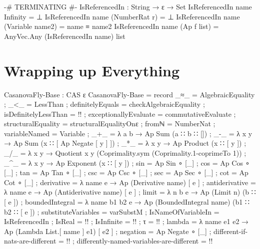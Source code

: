 \documentclass{report}
\begin{document}
\begin{code}
{-# TERMINATING #-}
IsReferencedIn : String → ε → Set
IsReferencedIn name Infinity = ⊥
IsReferencedIn name (NumberRat r) = ⊥
IsReferencedIn name (Variable name2) = name ≡ name2
IsReferencedIn name (Ap f list) = AnyVec.Any (IsReferencedIn name) list
\end{code}

\chapter{Wrapping up Everything}

\begin{code}
CasanovaFly-Base : CAS ε
CasanovaFly-Base = record
  { _≈_ = AlgebraicEquality
  ; _<_ = LessThan
  ; definitelyEquals = checkAlgebraicEquality
  ; isDefinitelyLessThan = {!!}
  ; exceptionallyEvaluate = commutativeEvaluate
  ; structuralEquality = structuralEqualityOnε
  ; fromℕ = NumberNat
  ; variableNamed = Variable
  ; _+_ = λ a b → Ap Sum (a ∷ b ∷ [])
  ; _-_ = λ x y → Ap Sum (x ∷ [ Ap Negate [ y ] ])
  ; _*_ = λ x y → Ap Product (x ∷ [ y ])
  ; _/_ = λ x y → Quotient x y (Coprimality.sym (Coprimality.1-coprimeTo 1))
  ; _^_ = λ x y → Ap Exponent (x ∷ [ y ])
  ; sin = Ap Sin ∘ [_]
  ; cos = Ap Cos ∘ [_]
  ; tan = Ap Tan ∘ [_]
  ; csc = Ap Csc ∘ [_]
  ; sec = Ap Sec ∘ [_]
  ; cot = Ap Cot ∘ [_]
  ; derivative = λ name e → Ap (Derivative name) [ e ]
  ; antiderivative = λ name e → Ap (Antiderivative name) [ e ]
  ; limit = λ n b e → Ap (Limit n) (b ∷ [ e ])
  ; boundedIntegral = λ name b1 b2 e → Ap (BoundedIntegral name) (b1 ∷ b2 ∷ [ e ])
  ; substituteVariables = varSubstM
  ; IsNameOfVariableIn = IsReferencedIn
  ; IsReal = {!!}
  ; IsInfinite = {!!}
  ; τ = {!!}
  ; lambda = λ name e1 e2 → Ap (Lambda List.[ name ] e1) [ e2 ]
  ; negation = Ap Negate ∘ [_]
  ; different-if-nats-are-different = {!!}
  ; differently-named-variables-are-different = {!!}
  }


\end{code}
\end{document}
